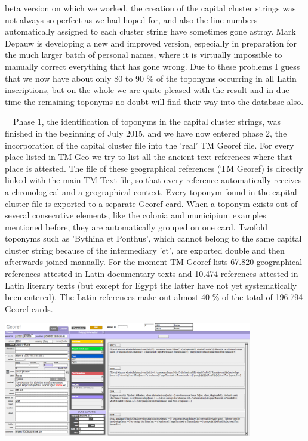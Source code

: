 \documentclass[amsthm,ebook]{saparticle}
\begin{document}
beta version on which we worked, the creation of the capital cluster strings was not always so perfect as we had hoped
for, and also the line numbers automatically assigned to each cluster string have sometimes gone astray. Mark Depauw is
developing a new and improved version, especially in preparation for the much larger batch of personal names, where it
is virtually impossible to manually correct everything that has gone wrong. Due to these problems I guess that we now
have about only 80 to 90 \% of the toponyms occurring in all Latin inscriptions, but on the whole we are quite pleased
with the result and in due time the remaining toponyms no doubt will find their way into the database also.

\ \ Phase 1, the identification of toponyms in the capital cluster strings, was finished in the beginning of July 2015,
and we have now entered phase 2, the incorporation of the capital cluster file into the 'real' TM Georef file. For
every place listed in TM Geo we try to list all the ancient text references where that place is attested. The file of
these geographical references (TM Georef) is directly linked with the main TM Text file, so that every reference
automatically receives a chronological and a geographical context. Every toponym found in the capital cluster file is
exported to a separate Georef card. When a toponym exists out of several consecutive elements, like the colonia and
municipium examples mentioned before, they are automatically grouped on one card. Twofold toponyms such as 'Bythina et
Ponthus', which cannot belong to the same capital cluster string because of the intermediary 'et', are exported double
and then afterwards joined manually. For the moment TM Georef lists 67.820 geographical references attested in Latin
documentary texts and 10.474 references attested in Latin literary texts (but except for Egypt the latter have not yet
systematically been entered). The Latin references make out almost 40 \% of the total of 196.794 Georef cards.


\bigskip

 \includegraphics[width=10.881cm,height=5.008cm]{EAGLE2016FullPaperVerreth-img002.png} 
\end{document}
